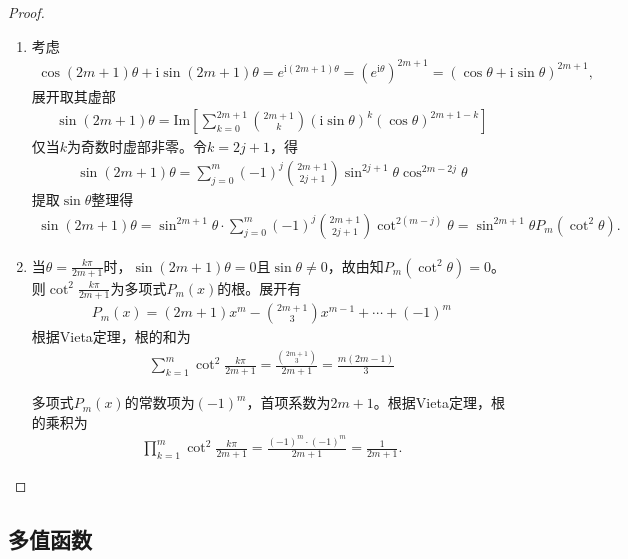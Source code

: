 \documentclass[../../main.tex]{subfiles}%
\begin{document}
\begin{proof}
\begin{enumerate}[(1)]
\item 考虑
\begin{align*}
\cos \left( 2m+1 \right) \theta +\mathrm{i}\sin \left( 2m+1 \right) \theta =e^{\mathrm{i}(2m+1)\theta}=(e^{\mathrm{i}\theta})^{2m+1}=\left( \cos \theta +\mathrm{i}\sin \theta \right) ^{2m+1},
\end{align*}
展开取其虚部
\begin{align*}
\sin(2m + 1)\theta = \mathrm{Im}\left[ \sum\limits_{k=0}^{2m+1} \binom{2m + 1}{k} (\mathrm{i}\sin\theta)^k(\cos\theta)^{2m+1-k} \right]
\end{align*}
仅当$k$为奇数时虚部非零。令$k = 2j + 1$，得
\begin{align*}
\sin(2m + 1)\theta = \sum\limits_{j=0}^{m}(-1)^j \binom{2m + 1}{2j + 1} \sin^{2j+1}\theta \cos^{2m-2j}\theta
\end{align*}
提取$\sin\theta$整理得
\begin{align*}
\sin(2m + 1)\theta = \sin^{2m+1}\theta \cdot \sum\limits_{j=0}^{m}(-1)^j \binom{2m + 1}{2j + 1} \cot^{2(m-j)}\theta = \sin^{2m+1}\theta P_m(\cot^2 \theta).
\end{align*}

\item 当$\theta = \frac{k\pi}{2m+1}$时，$\sin(2m+1)\theta = 0$且$\sin\theta \neq 0$，故由知$P_m(\cot^2 \theta) = 0$。则$\cot^2 \frac{k\pi}{2m+1}$为多项式$P_m(x)$的根。展开有
\begin{align*}
P_m(x) = (2m + 1)x^m - \binom{2m + 1}{3}x^{m-1} + \cdots + (-1)^m
\end{align*}
根据Vieta定理，根的和为
\begin{align*}
\sum\limits_{k=1}^{m} \cot^2 \frac{k\pi}{2m + 1} = \frac{\binom{2m+1}{3}}{2m + 1} = \frac{m(2m - 1)}{3}
\end{align*}

多项式$P_m(x)$的常数项为$(-1)^m$，首项系数为$2m + 1$。根据Vieta定理，根的乘积为
\begin{align*}
\prod\limits_{k=1}^{m} \cot^2 \frac{k\pi}{2m + 1} = \frac{(-1)^m \cdot (-1)^m}{2m + 1} = \frac{1}{2m + 1}.
\end{align*}
\end{enumerate}

\end{proof}




\subsection{多值函数}
\end{document}

